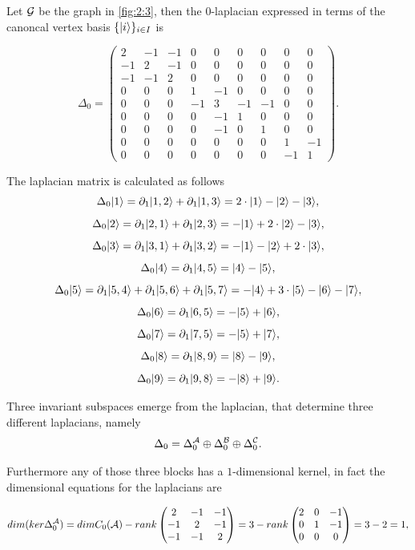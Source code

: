 \documentclass[../2.tex]{subfiles}
\begin{document}
    \begin{exa}
        Let $\mathcal{G}$ be the graph  in \autoref{fig:2:3}, then the $0$-laplacian expressed in terms of the canoncal vertex basis $\{| i \rangle\}_{i \in I}$ is

        \[ \Delta_0 = \begin{pmatrix}
                2 & -1 & -1 & 0 & 0 & 0 & 0 & 0 & 0 \\
                -1 & 2 & -1 & 0 & 0 & 0 & 0 & 0 & 0 \\
                -1 & -1 & 2 & 0 & 0 & 0 & 0 & 0 & 0 \\
                0 & 0 & 0 & 1 & -1 & 0 & 0 & 0 & 0 \\
                0 & 0 & 0 & -1 & 3 & -1 & -1 & 0 & 0 \\
                0 & 0 & 0 & 0 & -1 & 1 & 0 & 0 & 0 \\
                0 & 0 & 0 & 0 & -1 & 0 & 1 & 0 & 0 \\
                0 & 0 & 0 & 0 & 0 & 0 & 0 & 1 & -1 \\
                0 & 0 & 0 & 0 & 0 & 0 & 0 & -1 & 1 
            \end{pmatrix}. \] 

        The laplacian matrix is calculated as follows
        \[ \Delta_0 | 1 \rangle = \partial_1| 1,2 \rangle + \partial_1| 1,3 \rangle = 2\cdot| 1 \rangle-| 2 \rangle-| 3 \rangle,\]
        \[ \Delta_0 | 2 \rangle = \partial_1| 2,1 \rangle + \partial_1| 2,3 \rangle = -| 1 \rangle+2\cdot| 2 \rangle-| 3 \rangle,\]
        \[ \Delta_0 | 3 \rangle = \partial_1| 3,1 \rangle + \partial_1| 3,2 \rangle = -| 1 \rangle-| 2 \rangle+2\cdot| 3 \rangle,\]
        \[ \Delta_0 | 4 \rangle = \partial_1| 4,5 \rangle = | 4 \rangle-| 5 \rangle,\]
        \[ \Delta_0 | 5 \rangle = \partial_1| 5,4 \rangle+\partial_1| 5,6 \rangle+\partial_1| 5,7 \rangle = -| 4 \rangle+3\cdot| 5 \rangle-| 6 \rangle-| 7 \rangle,\]
        \[ \Delta_0 | 6 \rangle = \partial_1| 6,5 \rangle = -| 5 \rangle+| 6 \rangle,\]
        \[ \Delta_0 | 7 \rangle = \partial_1| 7,5 \rangle = -| 5 \rangle+| 7 \rangle,\]
        \[ \Delta_0 | 8 \rangle = \partial_1| 8,9 \rangle = | 8 \rangle-| 9 \rangle,\]
        \[ \Delta_0 | 9 \rangle = \partial_1| 9,8 \rangle = -| 8 \rangle+| 9 \rangle.\] 

        Three invariant subspaces emerge from the laplacian, that determine three different laplacians, namely
        \[ \Delta_0 = \Delta_0^{\mathcal{A}} \oplus \Delta_0^{\mathcal{B}} \oplus \Delta_0^{\mathcal{C}}. \]

        Furthermore any of those three blocks has a $1$-dimensional kernel, in fact the dimensional equations for the laplacians are

        \[dim(ker\Delta_0^{\mathcal{A}}) =dimC_0(\mathcal{A}) - rank
        \begin{pmatrix}
            2 & -1 & -1  \\
            -1 & 2 & -1  \\
            -1 & -1 & 2 
        \end{pmatrix} = 3 - rank
        \begin{pmatrix}
            2 & 0 & -1  \\
            0 & 1 & -1  \\
            0 & 0 & 0 
        \end{pmatrix} = 3 - 2 =  1, \]


\end{exa}
\end{document}
